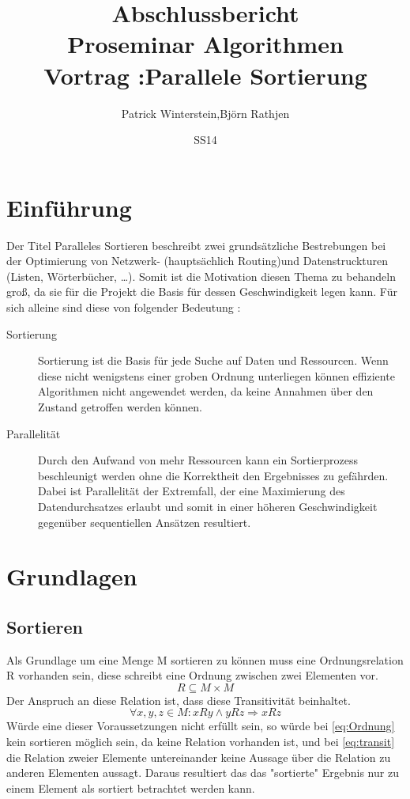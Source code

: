 \documentclass[11pt]{article}
\title{Abschlussbericht\\Proseminar Algorithmen\\Vortrag :Parallele Sortierung}
\author{Patrick Winterstein,Björn Rathjen}
\date{SS14}
\begin{document}
\maketitle
\newpage
\tableofcontents
\newpage
\listoffigures
\listoftables
\section{Einführung}
Der Titel Paralleles Sortieren beschreibt zwei grundsätzliche Bestrebungen bei der Optimierung von Netzwerk- (hauptsächlich Routing)und Datenstruckturen (Listen, Wörterbücher, \dots). Somit ist die Motivation diesen Thema zu behandeln groß, da sie für die Projekt die Basis für dessen Geschwindigkeit legen kann. Für sich alleine sind diese von folgender Bedeutung :
\begin{description}
\item[Sortierung] Sortierung ist die Basis für jede Suche auf Daten und Ressourcen. Wenn diese nicht wenigstens einer groben Ordnung unterliegen können effiziente Algorithmen nicht angewendet werden, da keine Annahmen über den Zustand getroffen werden können.
\item[Parallelität] Durch den Aufwand von mehr Ressourcen kann ein Sortierprozess beschleunigt werden ohne die Korrektheit den Ergebnisses zu gefährden. Dabei ist Parallelität der Extremfall, der eine Maximierung des Datendurchsatzes erlaubt und somit in einer höheren Geschwindigkeit gegenüber sequentiellen Ansätzen resultiert.
\end{description}
\section{Grundlagen}

\subsection{Sortieren}
Als Grundlage um eine Menge M sortieren zu können muss eine Ordnungsrelation R vorhanden sein, diese schreibt eine Ordnung zwischen zwei Elementen vor. 
\begin{equation}
R \subseteq M \times M
\label{eq:Ordnung}
\end{equation}
Der Anspruch an diese Relation ist, dass diese Transitivität beinhaltet.
\begin{equation}
\forall x,y,z \in M : xRy \wedge yRz \Rightarrow xRz
\label{eq:transit}
\end{equation}
Würde eine dieser Voraussetzungen nicht erfüllt sein, so würde bei \eqref{eq:Ordnung} kein sortieren möglich sein, da keine Relation vorhanden ist, und bei \eqref{eq:transit} die Relation zweier Elemente untereinander keine Aussage über die Relation zu anderen Elementen aussagt. Daraus resultiert das das "sortierte" Ergebnis nur zu einem Element als sortiert betrachtet werden kann.
\end{document}
